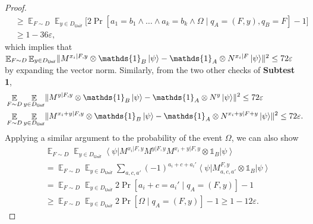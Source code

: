 \documentclass[11pt]{article}
\theoremstyle{plain}
\theoremstyle{definition}
\DeclarePairedDelimiter{\norm}{\lVert}{\rVert}
\newcommand {\bra} [1] {\ensuremath{ \left\langle #1 \right| }}
\newcommand {\ket} [1] {\ensuremath{ \left| #1 \right\rangle }}
\DeclareMathOperator*{\bigE}{\mathbb{E}}
\newcommand {\id} {\ensuremath{\mathds{1}}}
\newcommand{\ep} {\ensuremath{\varepsilon}}
\newcommand{\x}{\otimes}
\newcommand{\1}{\mathbb{1}} %
\newcommand{\Unif}{\mathsf{Unif}}
\begin{document}
\begin{proof}
\begin{align*}
	& \geq \bigE_{F \sim D} \bigE_{y \in D_{\Unif}} \Big[2 \Pr[a_1 =  b_1 \land \ldots \land a_k = b_k \land \Omega \mid q_A = (F,y), q_B = F] - 1\Big]\\
 &\geq 1 - 36\ep,
\end{align*}
which implies that $\bigE_{F \sim D}  \bigE_{y \in D_{\Unif}} \norm{ M^{x_i| F, y}\x\id_B \ket{\psi} - \id_A \x N^{x_i | F} \ket{\psi}}^2 \leq 72 \ep$ by expanding the vector norm.
Similarly, from the two other checks of \textbf{Subtest 1},
\begin{align*}
	&\bigE_{F \sim D}  \bigE_{y \in D_{\Unif}} \norm{ M^{y | F, y} \x \id_B\ket{\psi} - \id_A \x N^{y } \ket{\psi}}^2 \leq 72 \ep \\
	&\bigE_{F \sim D}  \bigE_{y \in D_{\Unif}} \norm{ M^{x_i+ y | F, y} \x \id_B \ket{\psi} - \id_A \x N^{x_i + y | F + y } \ket{\psi}}^2 \leq 72 \ep.
\end{align*}
Applying a similar argument to the probability of the event $\Omega$, we can also show 
\begin{align*}
	&\bigE_{F \sim D}  \bigE_{y \in D_{\Unif}} \bra{\psi} M^{x_i | F, y} M^{y | F, y} M^{x_i+y| F, y} 
	\x \id_B \ket{\psi} \\
	&= \bigE_{F \sim D}  \bigE_{y \in D_{\Unif}} \sum_{a, c, a'} (-1)^{a_i + c + a_i'} \bra{\psi} M^{F,y}_{a,c,a'} \x \id_B \ket{\psi} \\
	&= \bigE_{F \sim D} \bigE_{y \in D_{\Unif}} 2\Pr[ a_i + c = a_i' \mid q_A = (F,y)] -1 \\
	&\geq \bigE_{F \sim D} \bigE_{y \in D_{\Unif}}  2 \Pr[ \Omega \mid q_A = (F, y)] - 1 \geq 1 - 12\ep.
\end{align*}


\end{proof}
\end{document}
